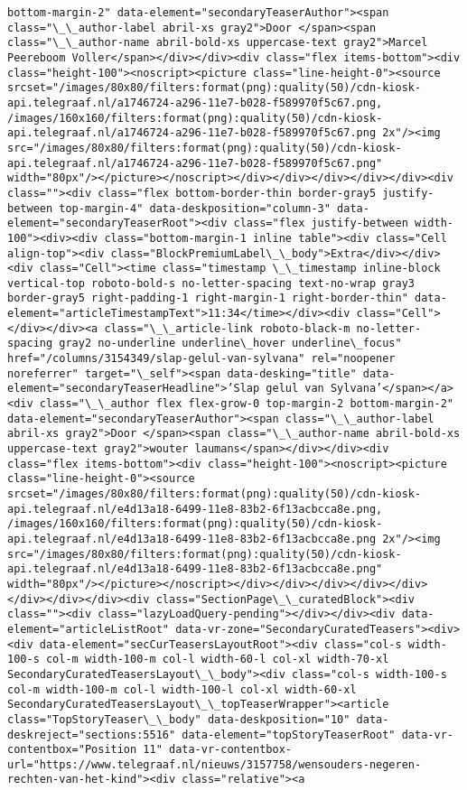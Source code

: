 \documentclass[11pt]{article}
\begin{document}
\begin{Verbatim}[commandchars=\\\{\}]
bottom-margin-2" data-element="secondaryTeaserAuthor"><span class="\_\_author-label abril-xs gray2">Door </span><span class="\_\_author-name abril-bold-xs uppercase-text gray2">Marcel Peereboom Voller</span></div></div><div class="flex items-bottom"><div class="height-100"><noscript><picture class="line-height-0"><source srcset="/images/80x80/filters:format(png):quality(50)/cdn-kiosk-api.telegraaf.nl/a1746724-a296-11e7-b028-f589970f5c67.png, /images/160x160/filters:format(png):quality(50)/cdn-kiosk-api.telegraaf.nl/a1746724-a296-11e7-b028-f589970f5c67.png 2x"/><img src="/images/80x80/filters:format(png):quality(50)/cdn-kiosk-api.telegraaf.nl/a1746724-a296-11e7-b028-f589970f5c67.png" width="80px"/></picture></noscript></div></div></div></div></div><div class=""><div class="flex bottom-border-thin border-gray5 justify-between top-margin-4" data-deskposition="column-3" data-element="secondaryTeaserRoot"><div class="flex justify-between width-100"><div><div class="bottom-margin-1 inline table"><div class="Cell align-top"><div class="BlockPremiumLabel\_\_body">Extra</div></div><div class="Cell"><time class="timestamp \_\_timestamp inline-block vertical-top roboto-bold-s no-letter-spacing text-no-wrap gray3 border-gray5 right-padding-1 right-margin-1 right-border-thin" data-element="articleTimestampText">11:34</time></div><div class="Cell"></div></div><a class="\_\_article-link roboto-black-m no-letter-spacing gray2 no-underline underline\_hover underline\_focus" href="/columns/3154349/slap-gelul-van-sylvana" rel="noopener noreferrer" target="\_self"><span data-desking="title" data-element="secondaryTeaserHeadline">’Slap gelul van Sylvana’</span></a><div class="\_\_author flex flex-grow-0 top-margin-2 bottom-margin-2" data-element="secondaryTeaserAuthor"><span class="\_\_author-label abril-xs gray2">Door </span><span class="\_\_author-name abril-bold-xs uppercase-text gray2">wouter laumans</span></div></div><div class="flex items-bottom"><div class="height-100"><noscript><picture class="line-height-0"><source srcset="/images/80x80/filters:format(png):quality(50)/cdn-kiosk-api.telegraaf.nl/e4d13a18-6499-11e8-83b2-6f13acbcca8e.png, /images/160x160/filters:format(png):quality(50)/cdn-kiosk-api.telegraaf.nl/e4d13a18-6499-11e8-83b2-6f13acbcca8e.png 2x"/><img src="/images/80x80/filters:format(png):quality(50)/cdn-kiosk-api.telegraaf.nl/e4d13a18-6499-11e8-83b2-6f13acbcca8e.png" width="80px"/></picture></noscript></div></div></div></div></div></div></div></div><div class="SectionPage\_\_curatedBlock"><div class=""><div class="lazyLoadQuery-pending"></div></div><div data-element="articleListRoot" data-vr-zone="SecondaryCuratedTeasers"><div><div data-element="secCurTeasersLayoutRoot"><div class="col-s width-100-s col-m width-100-m col-l width-60-l col-xl width-70-xl SecondaryCuratedTeasersLayout\_\_body"><div class="col-s width-100-s col-m width-100-m col-l width-100-l col-xl width-60-xl SecondaryCuratedTeasersLayout\_\_topTeaserWrapper"><article class="TopStoryTeaser\_\_body" data-deskposition="10" data-deskreject="sections:5516" data-element="topStoryTeaserRoot" data-vr-contentbox="Position 11" data-vr-contentbox-url="https://www.telegraaf.nl/nieuws/3157758/wensouders-negeren-rechten-van-het-kind"><div class="relative"><a 
\end{Verbatim}
\end{document}
